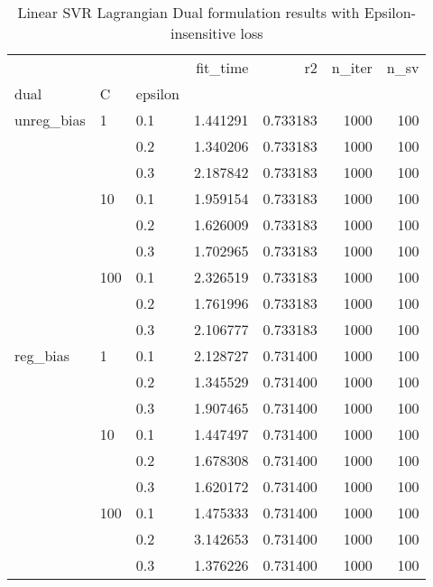 \begin{table}[H]
\centering
\caption{Linear SVR Lagrangian Dual formulation results with Epsilon-insensitive loss}
\label{linear_lagrangian_dual_svr_cv_results}
\begin{tabular}{lllrrrr}
\toprule
         &     &     &  fit\_time &        r2 &  n\_iter &  n\_sv \\
dual & C & epsilon &           &           &         &       \\
\midrule
unreg\_bias & 1   & 0.1 &  1.441291 &  0.733183 &    1000 &   100 \\
         &     & 0.2 &  1.340206 &  0.733183 &    1000 &   100 \\
         &     & 0.3 &  2.187842 &  0.733183 &    1000 &   100 \\
         & 10  & 0.1 &  1.959154 &  0.733183 &    1000 &   100 \\
         &     & 0.2 &  1.626009 &  0.733183 &    1000 &   100 \\
         &     & 0.3 &  1.702965 &  0.733183 &    1000 &   100 \\
         & 100 & 0.1 &  2.326519 &  0.733183 &    1000 &   100 \\
         &     & 0.2 &  1.761996 &  0.733183 &    1000 &   100 \\
         &     & 0.3 &  2.106777 &  0.733183 &    1000 &   100 \\
reg\_bias & 1   & 0.1 &  2.128727 &  0.731400 &    1000 &   100 \\
         &     & 0.2 &  1.345529 &  0.731400 &    1000 &   100 \\
         &     & 0.3 &  1.907465 &  0.731400 &    1000 &   100 \\
         & 10  & 0.1 &  1.447497 &  0.731400 &    1000 &   100 \\
         &     & 0.2 &  1.678308 &  0.731400 &    1000 &   100 \\
         &     & 0.3 &  1.620172 &  0.731400 &    1000 &   100 \\
         & 100 & 0.1 &  1.475333 &  0.731400 &    1000 &   100 \\
         &     & 0.2 &  3.142653 &  0.731400 &    1000 &   100 \\
         &     & 0.3 &  1.376226 &  0.731400 &    1000 &   100 \\
\bottomrule
\end{tabular}
\end{table}
